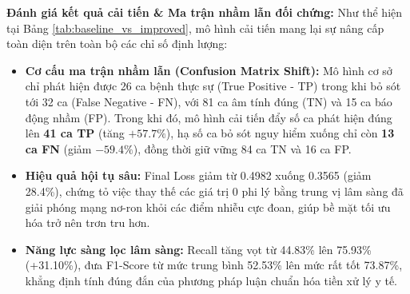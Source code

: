 \documentclass[12pt,a4paper]{report}
\begin{document}
\begin{table}[H]
\centering
\caption{So sánh đối chứng trực diện giữa Mô hình Cơ sở (Baseline) và Mô hình Cải tiến}
\label{tab:baseline_vs_improved}
\end{table}

\textbf{Đánh giá kết quả cải tiến \& Ma trận nhầm lẫn đối chứng:} 
Như thể hiện tại Bảng \ref{tab:baseline_vs_improved}, mô hình cải tiến mang lại sự nâng cấp toàn diện trên toàn bộ các chỉ số định lượng:
\begin{itemize}
    \item \textbf{Cơ cấu ma trận nhầm lẫn (Confusion Matrix Shift):} Mô hình cơ sở chỉ phát hiện được 26 ca bệnh thực sự (True Positive - TP) trong khi bỏ sót tới 32 ca (False Negative - FN), với 81 ca âm tính đúng (TN) và 15 ca báo động nhầm (FP). Trong khi đó, mô hình cải tiến đẩy số ca phát hiện đúng lên \textbf{41 ca TP} (tăng $+57.7\%$), hạ số ca bỏ sót nguy hiểm xuống chỉ còn \textbf{13 ca FN} (giảm $-59.4\%$), đồng thời giữ vững 84 ca TN và 16 ca FP.
    \item \textbf{Hiệu quả hội tụ sâu:} Final Loss giảm từ 0.4982 xuống 0.3565 (giảm 28.4\%), chứng tỏ việc thay thế các giá trị 0 phi lý bằng trung vị lâm sàng đã giải phóng mạng nơ-ron khỏi các điểm nhiễu cực đoan, giúp bề mặt tối ưu hóa trở nên trơn tru hơn.
    \item \textbf{Năng lực sàng lọc lâm sàng:} Recall tăng vọt từ 44.83\% lên 75.93\% (+31.10\%), đưa F1-Score từ mức trung bình 52.53\% lên mức rất tốt 73.87\%, khẳng định tính đúng đắn của phương pháp luận chuẩn hóa tiền xử lý y tế.
\end{itemize}
\end{document}
